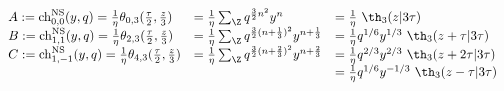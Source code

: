 \begin{equation} \label{1^6-char}
  \begin{array}{lll}
A := {\rm ch}_{0,0}^{\rm NS}(y,q) = {1\over \eta}
\theta_{0,3}({\tau\over 2}, {z\over 3}) &= {1\over \eta}
\sum_\Z q^{{3\over 2} n^2} y^n &= {1\over \eta} ~\th_3(z|3\tau) \\
B := {\rm ch}_{1,1}^{\rm NS}(y,q) = {1\over \eta} 
\theta_{2,3}({\tau\over 2}, {z\over 3}) &= {1\over \eta}
\sum_\Z q^{{3\over 2} (n+{1\over 3})^2} y^{n+{1\over 3}} &= {1\over
  \eta} q^{1/6} y^{1/3}~ \th_3(z+\tau |3\tau)\\  
C := {\rm ch}_{1,-1}^{\rm NS}(y,q) = {1\over \eta} 
\theta_{4,3}({\tau\over 2}, {z\over 3}) &= {1\over \eta}
\sum_\Z q^{{3\over 2} (n+{2\over 3})^2} y^{n+{2\over 3}} &= {1\over
  \eta} q^{2/3} y^{2/3}~\th_3(z+2\tau |3\tau) \\
&&= {1\over \eta}q^{1/6} y^{-1/3}~ \th_3(z-\tau |3\tau)
  \end{array}
\end{equation}

